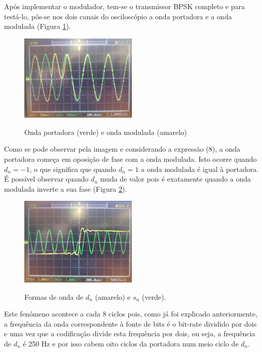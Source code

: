 \documentclass[11pt]{article}
\numberwithin{equation}{section}
\begin{document}
Após implementar o modulador, tem-se o transmissor BPSK completo e para testá-lo, pôs-se nos dois canais do osciloscópio a onda portadora e a onda modulada (Figura \ref{port_mod}).
\begin{figure}[H]
	\centering
	\includegraphics[width=0.5\textwidth]{./port_mod}~\\
	\caption{Onda portadora (verde) e onda modulada (amarelo)}
	\label{port_mod}
\end{figure} 
 \vspace{2 mm}
 
 Como se pode observar pela imagem e considerando a expressão (8), a onda portadora começa em oposição de fase com a onda modulada. Isto ocorre quando $d_n=-1$, o que significa que quando $d_n=1$ a onda modulada é igual à portadora. É possível observar quando $d_n$ muda de valor pois é exatamente quando a onda modulada inverte a sua fase (Figura \ref{dn_mod}). 
 
 
 \begin{figure}[H]
 	\centering
 	\includegraphics[width=0.5\textwidth]{./dn_mod}~\\
 	\caption{Formas de onda de $d_n$ (amarelo) e $s_n$ (verde).}
 	\label{dn_mod}
 \end{figure}
 Este fenómeno acontece a cada 8 ciclos pois, como já foi explicado anteriormente, a frequência da onda correspondente à fonte de bits é o bit-rate dividido por dois e uma vez que a codificação divide esta frequência por dois, ou seja, a frequência de $d_n$ é 250 Hz e por isso cabem oito ciclos da portadora num meio ciclo de $d_n$.
 \vspace{2 mm}
\end{document}
